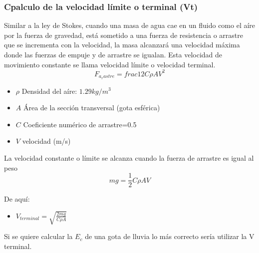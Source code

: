     \subsubsection{Cpalculo de la velocidad límite o terminal (Vt)}
    Similar a la ley de Stokes, cuando una masa de agua cae en un fluido como el aíre por la fuerza de gravedad, está sometido a una fuerza de resistencia o arrastre que se incrementa con la velocidad, la masa alcanzará una velocidad máxima donde las fuerzas de empuje y de arrastre se igualan. Esta velocidad de movimiento constante se llama velocidad límite o velocidad terminal. 
    \begin{equation}
        F_{a_rastre} =frac{1}{2}C\rho AV^2
    \end{equation}
    \begin{notation}
        \begin{itemize}
            \item $\rho$ Densidad del aíre: $1.29kg/m^3$
            \item $A$ Área de la sección transversal (gota esférica) \item $C$ Coeficiente numérico de arrastre=0.5 \item $V$ velocidad (m/s)
        \end{itemize}
    \end{notation}
    La velocidad constante o límite se alcanza cuando la fuerza de arrastre es igual al peso
    \begin{equation}
        mg = \frac{1}{2}C \rho AV
    \end{equation}
    \begin{notation}
        De aquí:
        \begin{itemize}
            \item $V_{terminal}=\sqrt{\frac{2mg}{C\rho A}}$
        \end{itemize}
    \end{notation}
    Si se quiere calcular la $E_c$ de una gota de lluvia lo más correcto sería utilizar la V terminal.
    
            
